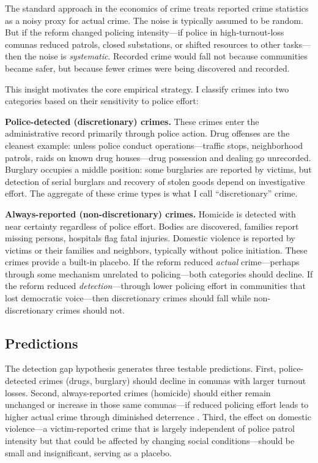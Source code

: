 \documentclass[12pt]{article}
\begin{document}
The standard approach in the economics of crime treats reported crime statistics as a noisy proxy for actual crime. The noise is typically assumed to be random. But if the reform changed policing intensity---if police in high-turnout-loss comunas reduced patrols, closed substations, or shifted resources to other tasks---then the noise is \textit{systematic}. Recorded crime would fall not because communities became safer, but because fewer crimes were being discovered and recorded.

This insight motivates the core empirical strategy. I classify crimes into two categories based on their sensitivity to police effort:

\textbf{Police-detected (discretionary) crimes.} These crimes enter the administrative record primarily through police action. Drug offenses are the cleanest example: unless police conduct operations---traffic stops, neighborhood patrols, raids on known drug houses---drug possession and dealing go unrecorded. Burglary occupies a middle position: some burglaries are reported by victims, but detection of serial burglars and recovery of stolen goods depend on investigative effort. The aggregate of these crime types is what I call ``discretionary'' crime.

\textbf{Always-reported (non-discretionary) crimes.} Homicide is detected with near certainty regardless of police effort. Bodies are discovered, families report missing persons, hospitals flag fatal injuries. Domestic violence is reported by victims or their families and neighbors, typically without police initiation. These crimes provide a built-in placebo. If the reform reduced \textit{actual} crime---perhaps through some mechanism unrelated to policing---both categories should decline. If the reform reduced \textit{detection}---through lower policing effort in communities that lost democratic voice---then discretionary crimes should fall while non-discretionary crimes should not.

\subsection{Predictions}

The detection gap hypothesis generates three testable predictions. First, police-detected crimes (drugs, burglary) should decline in comunas with larger turnout losses. Second, always-reported crimes (homicide) should either remain unchanged or increase in those same comunas---if reduced policing effort leads to higher actual crime through diminished deterrence \citep{Levitt1997,Chalfin2018,DiTella2004}. Third, the effect on domestic violence---a victim-reported crime that is largely independent of police patrol intensity but that could be affected by changing social conditions---should be small and insignificant, serving as a placebo.
\end{document}
